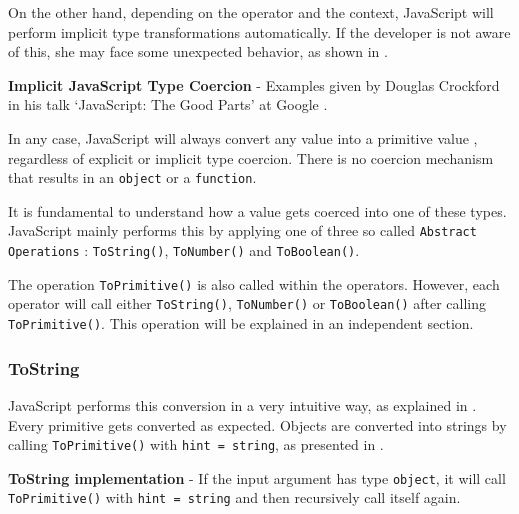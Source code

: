 On the other hand, depending on the operator and the context, JavaScript will perform implicit type transformations automatically. If the developer is not aware of this, she may face some unexpected behavior, as shown in .

\begin{code}
	\captionsetup{aboveskip=0pt, belowskip=10pt}
	\caption[Implicit JavaScript Type Coercion]{\textbf{Implicit JavaScript Type Coercion} - Examples given by Douglas Crockford in his talk `JavaScript: The Good Parts' at Google \citep{js-the-good-parts}.}
	\label{code:background-implicit-type-coercion}
\end{code}

In any case, JavaScript will always convert any value into a primitive value \citep{ecma-script}, regardless of explicit or implicit type coercion. There is no coercion mechanism that results in an \texttt{object} or a \texttt{function}.

It is fundamental to understand how a value gets coerced into one of these types. JavaScript mainly performs this by applying one of three so called \texttt{Abstract Operations} \citep{ecma-script}: \texttt{ToString()}, \texttt{ToNumber()} and \texttt{ToBoolean()}.

The operation \texttt{ToPrimitive()} is also called within the operators. However, each operator will call either \texttt{ToString()}, \texttt{ToNumber()} or \texttt{ToBoolean()} after calling \texttt{ToPrimitive()}. This operation will be explained in an independent section.

\subsubsection{ToString}
JavaScript performs this conversion in a very intuitive way, as explained in . Every primitive gets converted as expected. Objects are converted into strings by calling \texttt{ToPrimitive()} with \texttt{hint = string}, as presented in .

\begin{code}
	\captionsetup{aboveskip=0pt, belowskip=10pt}
	\caption[ToString implementation]{\textbf{ToString implementation} - If the input argument has type \texttt{object}, it will call \texttt{ToPrimitive()} with \texttt{hint = string} and then recursively call itself again.}
	\label{code:background-to-string-implementation}
\end{code}

